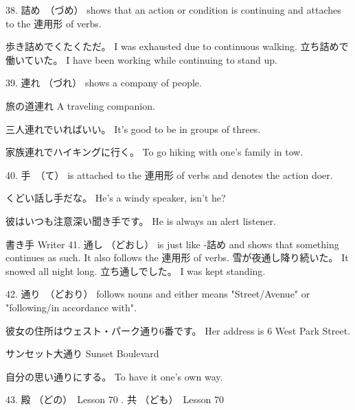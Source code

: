 \par{38. 詰め　（づめ） shows that an action or condition is continuing and attaches to the 連用形 of verbs. }

\par{歩き詰めでくたくただ。 \hfill\break
I was exhausted due to continuous walking. \hfill\break
\hfill\break
立ち詰めで働いていた。 \hfill\break
I have been working while continuing to stand up. }

\par{39. 連れ （づれ） shows a company of people. }

\par{旅の道連れ \hfill\break
A traveling companion. }

\par{三人連れでいればいい。 \hfill\break
It's good to be in groups of threes. }

\par{家族連れでハイキングに行く。 \hfill\break
To go hiking with one's family in tow. }

\par{40. 手　（て） is attached to the 連用形 of verbs and denotes the action doer. }

\par{くどい話し手だな。 \hfill\break
He's a windy speaker, isn't he? }

\par{彼はいつも注意深い聞き手です。 \hfill\break
He is always an alert listener. }

\par{書き手 \hfill\break
Writer }
41. 通し （どおし） is just like -詰め and shows that something continues as such. It also follows the 連用形 of verbs. \hfill\break
\hfill\break
雪が夜通し降り続いた。 \hfill\break
It snowed all night long. \hfill\break
\hfill\break
立ち通しでした。 \hfill\break
I was kept standing. 
\par{42. 通り　（どおり） follows nouns and either means "Street\slash Avenue" or "following\slash in accordance with". }

\par{彼女の住所はウェスト・パーク通り6番です。 \hfill\break
Her address is 6 West Park Street. }

\par{サンセット大通り \hfill\break
Sunset Boulevard }

\par{自分の思い通りにする。 \hfill\break
To have it one's own way. }

\par{43. 殿 （どの）　\textrightarrow  Lesson 70  \hfill{}. 共 （ども）　\textrightarrow  Lesson 70  \hfill\break
}

